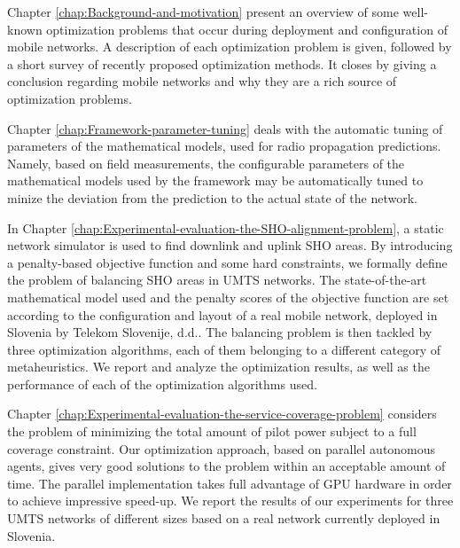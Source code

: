 Chapter \ref{chap:Background-and-motivation} present an overview
of some well-known optimization problems that occur during deployment
and configuration of mobile networks. A description of each optimization
problem is given, followed by a short survey of recently proposed
optimization methods. It closes by giving a conclusion regarding mobile
networks and why they are a rich source of optimization problems.

Chapter \ref{chap:Framework-parameter-tuning} deals with the automatic
tuning of parameters of the mathematical models, used for radio propagation
predictions. Namely, based on field measurements, the configurable
parameters of the mathematical models used by the framework may be
automatically tuned to minize the deviation from the prediction to
the actual state of the network.

In Chapter \ref{chap:Experimental-evaluation-the-SHO-alignment-problem},
a static network simulator is used to find downlink and uplink SHO
areas. By introducing a penalty-based objective function and some
hard constraints, we formally define the problem of balancing SHO
areas in UMTS networks. The state-of-the-art mathematical model used
and the penalty scores of the objective function are set according
to the configuration and layout of a real mobile network, deployed
in Slovenia by Telekom Slovenije, d.d.. The balancing problem is then
tackled by three optimization algorithms, each of them belonging to
a different category of metaheuristics. We report and analyze the
optimization results, as well as the performance of each of the optimization
algorithms used.

Chapter \ref{chap:Experimental-evaluation-the-service-coverage-problem}
considers the problem of minimizing the total amount of pilot power
subject to a full coverage constraint. Our optimization approach,
based on parallel autonomous agents, gives very good solutions to
the problem within an acceptable amount of time. The parallel implementation
takes full advantage of GPU hardware in order to achieve impressive
speed-up. We report the results of our experiments for three UMTS
networks of different sizes based on a real network currently deployed
in Slovenia.
